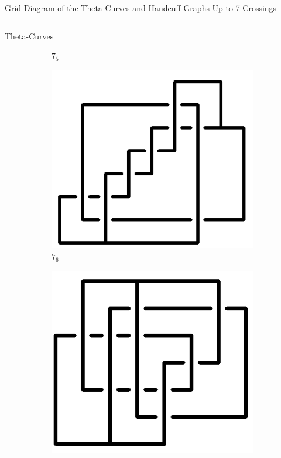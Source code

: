 \documentclass[final]{beamer}
\begin{document}
\begin{frame}[t]
\begin{alertblock}{Grid Diagram of the Theta-Curves and Handcuff Graphs Up to 7 Crossings}
\begin{columns}[t]
\begin{column}{0.5\textwidth}
\begin{alertblock}{Theta-Curves}
\begin{figure}
\begin{subfigure}{0.075\textwidth}
    \caption{$7_{5}$} 
    \end{subfigure}
    \begin{subfigure}{0.075\textwidth}
    \includegraphics[width=\columnwidth]{../Midterm_Poster/grid_diagram/theta_7_6.png}
    \caption{$7_{6}$} 
    \end{subfigure}
    \begin{subfigure}{0.075\textwidth}
    \includegraphics[width=\columnwidth]{../Midterm_Poster/grid_diagram/theta_7_7.png}

\end{subfigure}
\end{figure}
\end{alertblock}
\end{column}
\end{columns}
\end{alertblock}
\end{frame}
\end{document}
